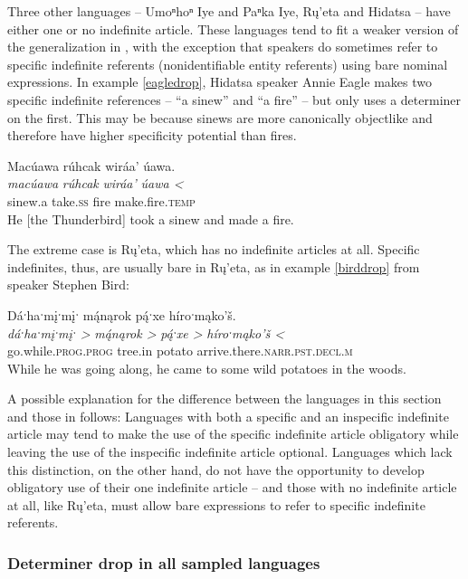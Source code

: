 \documentclass[output=paper]{LSP/langsci}
\begin{document}
Three other languages -- Umoⁿhoⁿ Iye and Paⁿka Iye, Rų’eta and Hidatsa -- have either one or no indefinite article. These languages tend to fit a weaker version of the generalization in , with the exception that speakers do sometimes refer to specific indefinite referents (nonidentifiable entity referents) using bare nominal expressions. In example \ref{eagledrop}, Hidatsa speaker Annie Eagle makes two specific indefinite references -- “a sinew” and “a fire” -- but only uses a determiner on the first. This may be because sinews are more canonically objectlike and therefore have higher specificity potential than fires.

\ea\label{eagledrop}
Macúawa rúhcak wiráa’ úawa.\footnotemark\\
\gll	\emph{macúawa} 	\emph{rúhcak} 	\emph{wiráa’}	\emph{úawa <}\\
	sinew.a 		take.\textsc{ss} 	fire 			make.fire.\textsc{temp}\\
\glt	He [the Thunderbird] took a sinew and made a fire.
\z

The extreme case is Rų’eta, which has no indefinite articles at all. Specific indefinites, thus, are usually bare in Rų’eta, as in example \ref{birddrop} from speaker Stephen Bird:

\ea\label{birddrop}
Dáˑhaˑmįˑmįˑ m\'{ą}nąrok p\'{ą}ˑxe híroˑmąko’š.\footnotemark\\
\gll	\emph{dáˑhaˑmįˑmįˑ >}		\emph{m\'{ą}nąrok >}	\emph{p\'{ą}ˑxe >}	\emph{híroˑmąko’š <}\\
	go.while.\textsc{prog.prog} 	tree.in 			potato 		arrive.there.\textsc{narr.pst.decl.m}\\
\glt	While he was going along, he came to some wild potatoes in the woods.
\z

A possible explanation for the difference between the languages in this section and those in  follows: Languages with both a specific and an inspecific indefinite article may tend to make the use of the specific indefinite article obligatory while leaving the use of the inspecific indefinite article optional. Languages which lack this distinction, on the other hand, do not have the opportunity to develop obligatory use of their one indefinite article -- and those with no indefinite article at all, like Rų’eta, must allow bare expressions to refer to specific indefinite referents.

\subsubsection{Determiner drop in all sampled languages}\label{dropsummary}
\end{document}
